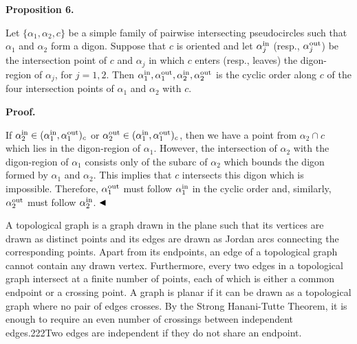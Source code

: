 \par\medskip\noindent\textbf{Proposition 6.}\par
Let $\{\alpha_{1},\alpha_{2},c\}$ be a simple family of pairwise intersecting pseudocircles such that $\alpha_{1}$ and $\alpha_{2}$ form a digon. Suppose that $c$ is oriented and let $\alpha_{j}^{\rm in}$ (resp., $\alpha_{j}^{\rm out}$) be the intersection point of $c$ and $\alpha_{j}$ in which $c$ enters (resp., leaves) the digon-region of $\alpha_{j}$, for $j=1,2$. Then $\alpha_{1}^{\rm in},\alpha_{1}^{\rm out},\alpha_{2}^{\rm in},\alpha_{2}^{\rm
out}$ is the cyclic order along $c$ of the four intersection points of $\alpha_{1}$ and $\alpha_{2}$ with $c$.
\par
\par
\par
\par
\par\medskip\noindent\textbf{Proof.}\par
If $\alpha_{2}^{\rm in}\in(\alpha_{1}^{\rm in},\alpha_{1}^{\rm out})_{c}$ or $\alpha_{2}^{\rm out}\in(\alpha_{1}^{\rm in},\alpha_{1}^{\rm out})_{c}$, then we have a point from $\alpha_{2}\cap c$ which lies in the digon-region of $\alpha_{1}$. However, the intersection of $\alpha_{2}$ with the digon-region of $\alpha_{1}$ consists only of the subarc of $\alpha_{2}$ which bounds the digon formed by $\alpha_{1}$ and $\alpha_{2}$. This implies that $c$ intersects this digon which is impossible. Therefore, $\alpha_{1}^{\rm out}$ must follow $\alpha_{1}^{\rm in}$ in the cyclic order and, similarly, $\alpha_{2}^{\rm out}$ must follow $\alpha_{2}^{\rm in}$. $\hfill\blacktriangleleft$
\par
\par
A topological graph is a graph drawn in the plane such that its vertices are drawn as distinct points and its edges are drawn as Jordan arcs connecting the corresponding points. Apart from its endpoints, an edge of a topological graph cannot contain any drawn vertex. Furthermore, every two edges in a topological graph intersect at a finite number of points, each of which is either a common endpoint or a crossing point. A graph is planar if it can be drawn as a topological graph where no pair of edges crosses. By the Strong Hanani-Tutte Theorem, it is enough to require an even number of crossings between independent edges.222Two edges are independent if they do not share an endpoint.
\par
\par
